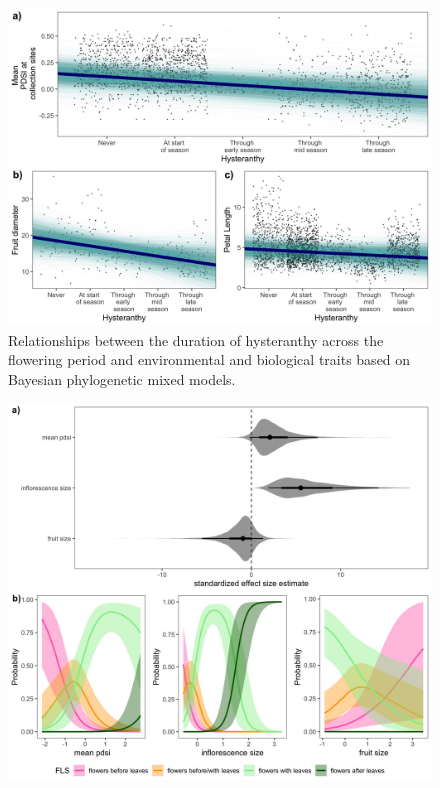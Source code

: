 \documentclass{article}[11pt]
\begin{document}
\begin{figure}[h!]
    \centering
 \includegraphics[width=\textwidth]{..//..//Plots/dataplots.jpeg}
    \caption{Relationships between the duration of hysteranthy across the flowering period and environmental and biological traits based on Bayesian phylogenetic mixed models.}
    \label{fig:prunes}
\end{figure}


\begin{figure}[h!]
    \centering
 \includegraphics[width=\textwidth]{..//..//Plots/fullprunus_4manu.jpeg}
    \caption{}
    \label{fig:genus}
\end{figure}

\end{document}
